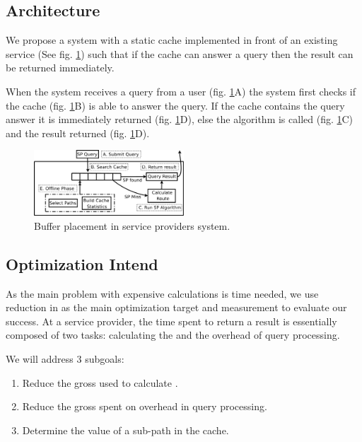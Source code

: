 \subsection{Architecture}
We propose a system with a static \spath cache implemented in front of an existing \spath service (See fig. \ref{fig:routequery}) such that if the cache can answer a query then the result can be returned immediately. 

When the system receives a \spath query from a user (fig. \ref{fig:routequery}A) the system first checks if the cache (fig. \ref{fig:routequery}B) is able to answer the query. If the cache contains the query answer it is immediately returned (fig. \ref{fig:routequery}D), else the \spath algorithm is called (fig. \ref{fig:routequery}C) and the \spath result returned (fig. \ref{fig:routequery}D).

\begin{figure}
  \center
        \includegraphics[width=0.5\textwidth]{figures/routequery}
        \caption{Buffer placement in \spath service providers system.}
  \label{fig:routequery}
\end{figure}


\subsection{Optimization Intend} \label{subsec:goals}

As the main problem with expensive \spath calculations is time needed, we use reduction in \textit{\cet} as the main optimization target and measurement to evaluate our success.
At a \spath service provider, the time spent to return a \spath result is essentially composed of two tasks: calculating the \spath and the overhead of query processing. 

We will address 3 subgoals:
\begin{enumerate}
\item \label{item:goal1}Reduce the gross \cet used to calculate \spathsns.
\item \label{item:goal2}Reduce the gross \cet spent on overhead in query processing.
\item \label{item:goal3}Determine the value of a sub-path in the cache.
\end{enumerate}

